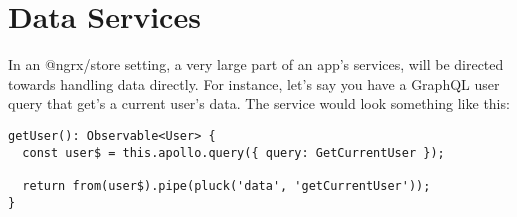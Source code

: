 \maketitle{}
\section{ Data Services }

In an @ngrx/store setting, a very large part of an app's services, will be
directed towards handling data directly. For instance, let's say you have a
GraphQL user query that get's a current user's data. The service would look
something like this:
\begin{lstlisting}
getUser(): Observable<User> {
  const user$ = this.apollo.query({ query: GetCurrentUser });

  return from(user$).pipe(pluck('data', 'getCurrentUser'));
}
\end{lstlisting}
